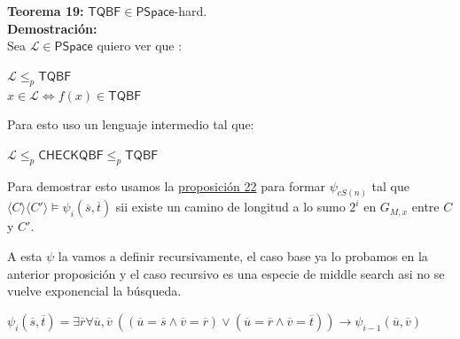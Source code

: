 \documentclass{article}
\begin{document}
\begin{flushleft}
  \textbf{Teorema 19:}
  $\mathsf{TQBF} \in \mathsf{PSpace}$-hard. \\[0.5em]

  \textbf{\textcolor{Mulberry}{Demostración:}} \\[0.5em]

  Sea $\mathcal{L} \in \mathsf{PSpace}$ quiero ver que :
\end{flushleft}
\begin{center}
  $\mathcal{L} \leq_p \mathsf{TQBF}$ \\[0.5em]

  $x \in \mathcal{L} \iff f(x) \in \mathsf{TQBF}$
\end{center}
\begin{flushleft}
  Para esto uso un lenguaje intermedio tal que:
\end{flushleft}
\begin{center}
  $\mathcal{L} \leq_p \mathsf{CHECKQBF} \leq_p \mathsf{TQBF}$ 
\end{center}
\begin{flushleft}
  Para demostrar esto usamos la \hyperlink{prop22}{\textcolor{Rhodamine}{proposición 22}} para formar $\psi_{c 
  \dot S(n)}$ tal que $\langle C \rangle \langle C' \rangle \models \psi_i(\overline{s}, \overline{t})$ sii existe
  un camino de longitud a lo sumo $2^i$ en $G_{M,x}$ entre $C$ y $C'$.
  
  A esta $\psi$ la vamos a definir recursivamente, el caso base ya lo probamos en la anterior proposición y el caso
  recursivo es una especie de middle search asi no se vuelve exponencial la búsqueda.
\end{flushleft}
\begin{center}
  $\psi_i(\overline{s}, \overline{t}) = \exists \overline{r} \forall \overline{u}, \overline{v} \ ((\overline{u} = 
  \overline{s} \land \overline{v} = \overline{r}) \lor (\overline{u} = \overline{r} \land \overline{v} = \overline{t}))
  \rightarrow \psi_{i-1}(\overline{u}, \overline{v})$
\end{center}
\end{document}
